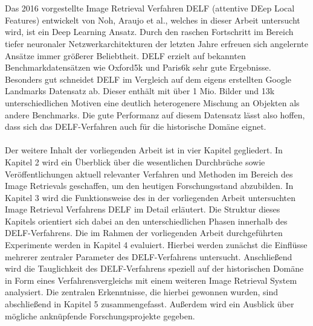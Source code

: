 \\\\
Das 2016 vorgestellte Image Retrieval Verfahren DELF (attentive DEep Local Features) \cite{delf} entwickelt von Noh, \mbox{Araujo} et al., welches in dieser Arbeit untersucht wird, ist ein Deep Learning Ansatz. Durch den raschen Fortschritt im Bereich tiefer neuronaler Netzwerkarchitekturen der letzten Jahre erfreuen sich angelernte Ansätze immer größerer Beliebtheit. DELF erzielt auf bekannten Benchmarkdatensätzen wie Oxford5k \cite{oxford5k} und Paris6k \cite{paris6k} sehr gute Ergebnisse. Besonders gut schneidet DELF im Vergleich auf dem eigens erstellten Google Landmarks Datensatz \cite{landmarks} ab. Dieser enthält mit über 1 Mio. Bilder und 13k unterschiedlichen Motiven eine deutlich heterogenere Mischung an Objekten als andere Benchmarks. Die gute Performanz auf diesem Datensatz lässt also hoffen, dass sich das DELF-Verfahren auch für die historische Domäne eignet.
\\\\
Der weitere Inhalt der vorliegenden Arbeit ist in vier Kapitel gegliedert. In Kapitel 2 wird ein Überblick über die wesentlichen Durchbrüche sowie Veröffentlichungen aktuell relevanter Verfahren und Methoden im Bereich des Image Retrievals geschaffen, um den heutigen Forschungsstand abzubilden. In Kapitel 3 wird die Funktionsweise des in der vorliegenden Arbeit untersuchten Image Retrieval Verfahrens DELF im Detail erläutert. Die Struktur dieses Kapitels orientiert sich dabei an den unterschiedlichen Phasen innerhalb des DELF-Verfahrens. Die im Rahmen der vorliegenden Arbeit durchgeführten Experimente werden in Kapitel 4 evaluiert. Hierbei werden zunächst die Einflüsse mehrerer zentraler Parameter des DELF-Verfahrens untersucht. Anschließend wird die Tauglichkeit des DELF-Verfahrens speziell auf der historischen Domäne in Form eines Verfahrensvergleichs mit einem weiteren Image Retrieval System analysiert. Die zentralen Erkenntnisse, die hierbei gewonnen wurden, sind abschließend in Kapitel 5 zusammengefasst. Außerdem wird ein Ausblick über mögliche anknüpfende Forschungsprojekte gegeben.
